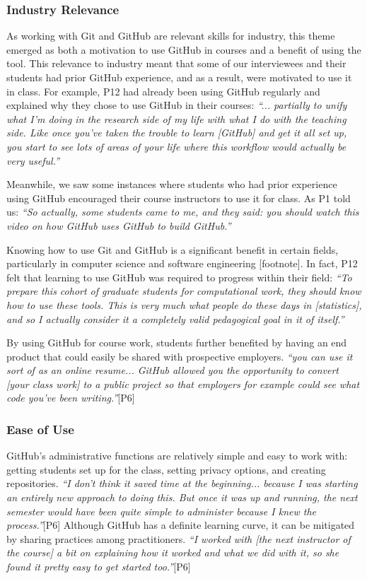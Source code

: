 \subsubsection{Industry Relevance}
As working with Git and GitHub are relevant skills for industry, this theme emerged as both a motivation to use GitHub in courses and a benefit of using the tool. This relevance to industry meant that some of our interviewees and their students had prior GitHub experience, and as a result, were motivated to use it in class. For example, P12 had already been using GitHub regularly and explained why they chose to use GitHub in their courses: \textit{``... partially to unify what I'm doing in the research side of my life with what I do with the teaching side. Like once you've taken the trouble to learn [GitHub] and get it all set up, you start to see lots of areas of your life where this workflow would actually be very useful.''}

Meanwhile, we saw some instances where students who had prior experience using GitHub encouraged their course instructors to use it for class. As P1 told us: \textit{``So actually, some students came to me, and they said: you should watch this video on how GitHub uses GitHub to build GitHub.''}

Knowing how to use Git and GitHub is a significant benefit in certain fields, particularly in computer science and software engineering [footnote]. In fact, P12 felt that learning to use GitHub was required to progress within their field: \textit{``To prepare this cohort of graduate students for computational work, they should know how to use these tools. This is very much what people do these days in [statistics], and so I actually consider it a completely valid pedagogical goal in it of itself.''}

By using GitHub for course work, students further benefited by having an end product that could easily be shared with prospective employers. \textit{``you can use it sort of as an online resume... GitHub allowed you the opportunity to convert [your class work] to a public project so that employers for example could see what code you've been writing.''}[P6]

\subsubsection{Ease of Use}
GitHub's administrative functions are relatively simple and easy to work with: getting students set up for the class, setting privacy options, and creating repositories. \textit{``I don't think it saved time at the beginning... because I was starting an entirely new approach to doing this. But once it was up and running, the next semester would have been quite simple to administer because I knew the process.''}[P6] Although GitHub has a definite learning curve, it can be mitigated by sharing practices among practitioners. \textit{``I worked with [the next instructor of the course] a bit on explaining how it worked and what we did with it, so she found it pretty easy to get started too.''}[P6]

